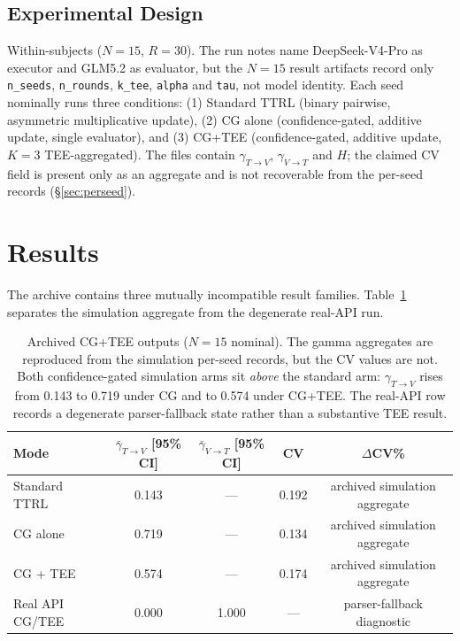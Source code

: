 \documentclass[11pt]{article}
\begin{document}
\subsection{Experimental Design}

Within-subjects ($N{=}15$, $R{=}30$). The run notes name DeepSeek-V4-Pro as executor and GLM5.2 as evaluator, but the $N{=}15$ result artifacts record only \texttt{n\_seeds}, \texttt{n\_rounds}, \texttt{k\_tee}, \texttt{alpha} and \texttt{tau}, not model identity. Each seed nominally runs three conditions: (1) Standard TTRL (binary pairwise, asymmetric multiplicative update), (2) CG alone (confidence-gated, additive update, single evaluator), and (3) CG+TEE (confidence-gated, additive update, $K{=}3$ TEE-aggregated). The files contain $\gamma_{T\to V}$, $\gamma_{V\to T}$ and $H$; the claimed CV field is present only as an aggregate and is not recoverable from the per-seed records (\S\ref{sec:perseed}).

\section{Results}

The archive contains three mutually incompatible result families. Table~\ref{tab:results} separates the simulation aggregate from the degenerate real-API run.

\begin{table}[H]
\centering
\caption{Archived CG+TEE outputs ($N{=}15$ nominal). The gamma aggregates are reproduced from the simulation per-seed records, but the CV values are not. Both confidence-gated simulation arms sit \emph{above} the standard arm: $\gamma_{T\to V}$ rises from 0.143 to 0.719 under CG and to 0.574 under CG+TEE. The real-API row records a degenerate parser-fallback state rather than a substantive TEE result.}
\label{tab:results}
\begin{tabular}{@{}lcccc@{}}
\toprule
\textbf{Mode} & $\bar{\gamma}_{T{\to}V}$ [95\% CI] & $\bar{\gamma}_{V{\to}T}$ [95\% CI] & CV & $\Delta$CV\% \\
\midrule
Standard TTRL   & 0.143 & --- & 0.192 & archived simulation aggregate \\
CG alone        & 0.719 & --- & 0.134 & archived simulation aggregate \\
CG + TEE        & 0.574 & --- & 0.174 & archived simulation aggregate \\
Real API CG/TEE & 0.000 & 1.000 & --- & parser-fallback diagnostic \\
\bottomrule
\end{tabular}
\end{table}
\end{document}
